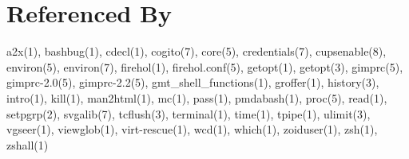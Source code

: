 \section{Referenced By}\label{sec:referencedby}
    a2x(1), bashbug(1), cdecl(1), cogito(7), core(5), credentials(7), cupsenable(8), environ(5), environ(7), firehol(1), firehol.conf(5), getopt(1), getopt(3), gimprc(5), gimprc-2.0(5), gimprc-2.2(5), gmt\_shell\_functions(1), groffer(1), history(3), intro(1), kill(1), man2html(1), mc(1), pass(1), pmdabash(1), proc(5), read(1), setpgrp(2), svgalib(7), tcflush(3), terminal(1), time(1), tpipe(1), ulimit(3), vgseer(1), viewglob(1), virt-rescue(1), wcd(1), which(1), zoiduser(1), zsh(1), zshall(1)